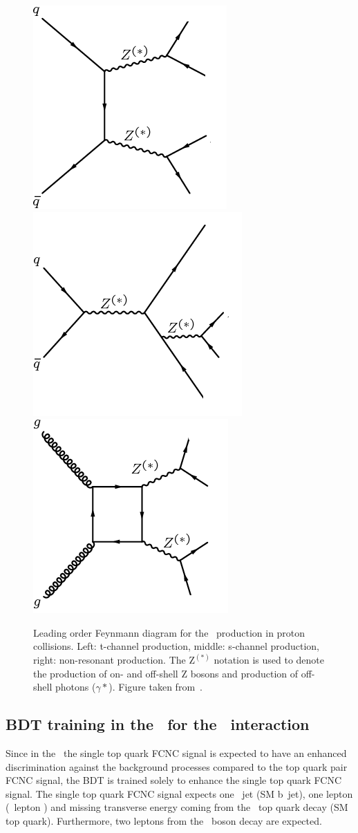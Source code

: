 \begin{figure}[htbp]
	\centering
	\includegraphics[width=0.3\linewidth]{6_Search/Figures/Feynman/ZZ}
	\includegraphics[width=0.3\linewidth]{6_Search/Figures/Feynman/ZZ2}
		\includegraphics[width=0.3\linewidth]{6_Search/Figures/Feynman/ZZ3}
	\caption{Leading order Feynmann diagram for the \ZZ\ production in proton collisions. Left: t-channel production, middle: s-channel production, right: non-resonant production. The Z$^{(*)}$ notation is used to denote the production of on- and off-shell Z bosons and production of off-shell photons ($\gamma*$). Figure taken from~\cite{Khachatryan:1712680}.}
	\label{fig:ZZ}
\end{figure}
\newpage
\subsection{BDT training in the \STSR\ for the \Zut\ interaction}
\label{sec:BDTSTSRZUT}
Since in the \STSR\, the single top quark FCNC signal is expected to have an enhanced discrimination against the background processes compared to the top quark pair FCNC signal,  the BDT is trained solely to enhance the single top quark FCNC signal. The single top quark FCNC signal expects one \Pbottom\ jet (SM b~jet), one lepton (\PW\ lepton ) and missing transverse energy coming from the \SM\ top quark decay (SM top quark). Furthermore, two leptons from the \PZ\ boson decay are expected. 

